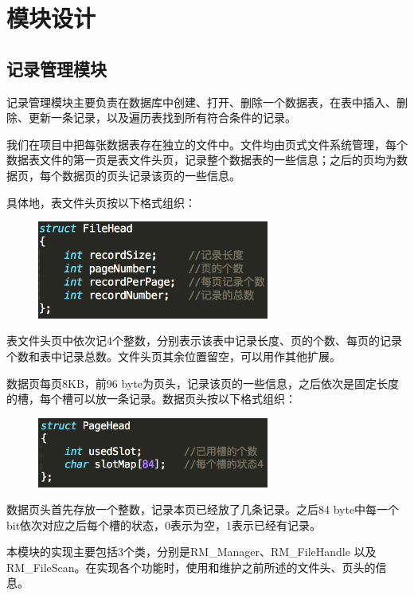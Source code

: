 
\chapter{模块设计} %

\label{Chapter3} %

\section{记录管理模块}
记录管理模块主要负责在数据库中创建、打开、删除一个数据表，在表中插入、删除、更新一条记录，以及遍历表找到所有符合条件的记录。

我们在项目中把每张数据表存在独立的文件中。文件均由页式文件系统管理，每个数据表文件的第一页是表文件头页，记录整个数据表的一些信息；之后的页均为数据页，每个数据页的页头记录该页的一些信息。

具体地，表文件头页按以下格式组织：
\begin{figure}[H]
\centering
\includegraphics[width=3in]{Figures/FileHead.png}
\end{figure}
表文件头页中依次记4个整数，分别表示该表中记录长度、页的个数、每页的记录个数和表中记录总数。文件头页其余位置留空，可以用作其他扩展。

数据页每页8KB，前96 byte为页头，记录该页的一些信息，之后依次是固定长度的槽，每个槽可以放一条记录。数据页头按以下格式组织：
\begin{figure}[H]
\centering
\includegraphics[width=3in]{Figures/PageHead.png}
\end{figure}
数据页头首先存放一个整数，记录本页已经放了几条记录。之后84 byte中每一个bit依次对应之后每个槽的状态，0表示为空，1表示已经有记录。

本模块的实现主要包括3个类，分别是RM\_Manager、RM\_FileHandle 以及 RM\_FileScan。在实现各个功能时，使用和维护之前所述的文件头、页头的信息。

